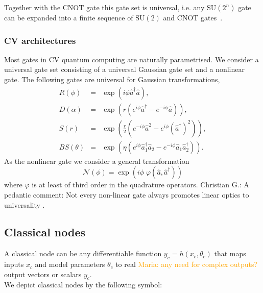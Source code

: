 \documentclass[aps,pra,10pt,twocolumn,groupedaddress,nofootinbib]{revtex4-1}
\theoremstyle{plain}
\newcommand{\SU}{\text{SU}} %
\newcommand{\CNOT}{\text{CNOT}}
\renewcommand{\a}{\hat{a}}
\newcommand{\adag}{\hat{a}^{\dagger}}
\newcommand{\maria}[1]{\textcolor{orange}{Maria: #1}}
\newcommand{\cg}[1]{\textcolor{cyan!80!black}{Christian G.: #1}}
\begin{document}
Together with the $\CNOT$ gate this gate set is universal, i.e. any $\SU(2^n)$
gate can be expanded into a finite sequence of $\SU(2)$ and $\CNOT$ gates~\cite{barenco1995}.

\subsubsection{CV architectures}

Most gates in CV quantum computing are naturally parametrised. We consider a universal gate set consisting of a universal Gaussian gate set and a nonlinear gate. The following gates are universal for Gaussian transformations,
\begin{eqnarray}
  	R(\phi) & =& \exp\left(i \phi \adag \a \right), \\
  	D(\alpha) & =& \exp(r (e^{i\phi} \adag -e^{-i\phi} \a)), \\
  	S(r) & =& \exp \left(\frac{r}{2} \left(e^{-i\phi} \a^2 -e^{i\phi}  (\adag)^2 \right) \right), \\
  	BS(\theta) & =& \exp\left(\eta (e^{i \phi} \adag_1 \a_2 -e^{-i \phi}\a_1 \adag_2) \right).
  \label{Eq:gaussiangates}
\end{eqnarray}
As the nonlinear gate we consider a general transformation
\begin{equation}
	\mathcal{N}(\phi) = \exp(i \phi \; \varphi(\a, \adag))
	\label{Eq:nonlineargate}
\end{equation}
where $\varphi$ is at least of third order in the quadrature operators.
\cg{A pedantic comment: Not every non-linear gate always promotes linear optics to universality \cite{Oszmaniec2017}.}

\subsection{Classical nodes}

A classical node can be any differentiable function $y_c = h(x_c, \theta_c)$ that maps inputs $x_c$ and model parameters $\theta_c$ to real \maria{any need for complex outputs?} output vectors or scalars $y_c$.\\

We depict classical nodes by the following symbol:\\
\begin{figure}[h]
\centering
{}
\end{figure}
\end{document}
